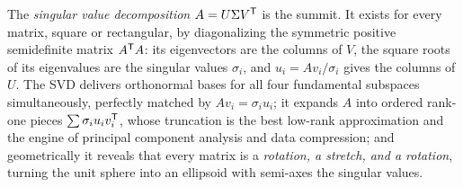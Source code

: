 The \emph{singular value decomposition} $A=U\Sigma V^{\mathsf T}$ is the summit. It exists for every matrix, square or rectangular, by diagonalizing the symmetric positive semidefinite matrix $A^{\mathsf T} A$: its eigenvectors are the columns of $V$, the square roots of its eigenvalues are the singular values $\sigma_i$, and $u_i=Av_i/\sigma_i$ gives the columns of $U$. The SVD delivers orthonormal bases for all four fundamental subspaces simultaneously, perfectly matched by $Av_i=\sigma_i u_i$; it expands $A$ into ordered rank-one pieces $\sum\sigma_i u_iv_i^{\mathsf T}$, whose truncation is the best low-rank approximation and the engine of principal component analysis and data compression; and geometrically it reveals that every matrix is a \emph{rotation, a stretch, and a rotation}, turning the unit sphere into an ellipsoid with semi-axes the singular values.

